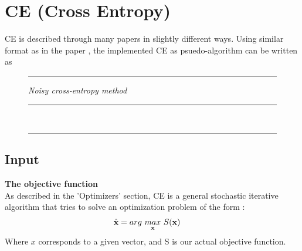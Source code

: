 \section{CE (Cross Entropy)}
CE is described through many papers in 
slightly different ways. Using similar 
format as in the paper \citep{thiery:09}, 
the implemented CE as psuedo-algorithm can be written as

\begin{figure}[ht]
\hrule
\vspace{0.2cm}
{\centering  \textit{Noisy cross-entropy method}}
\vspace{0.2cm}
\hrule
\begin{algorithmic}
\\

\Loop
{}
\EndLoop
\end{algorithmic}
\hrule
\end{figure}

\subsection{Input}

\textbf{The objective function} \\
As described in the 'Optimizers' section, CE is a general stochastic 
iterative algorithm that tries to solve an optimization problem of 
the form \citep{thiery:09}:
\begin{align*}
\hat{\textbf{\individual }} &= 
arg \  \underset{\textbf{\individual }}{max} \  
\fitnessFunction (\textbf{\individual }) \ 
\end{align*}
Where $x$ corresponds to a given vector, and S is our actual objective function. 
\\

